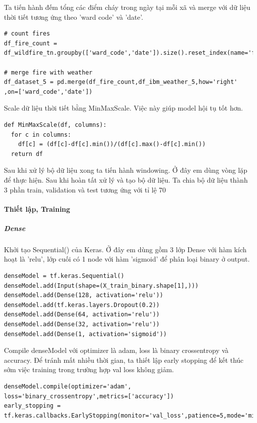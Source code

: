 \documentclass{article}
\begin{document}
Ta tiến hành đếm tổng các điểm cháy trong ngày tại mỗi xã và merge với dữ liệu thời tiết tương ứng theo 'ward code' và 'date'.

\begin{verbatim}
# count fires
df_fire_count = df_wildfire_tn.groupby(['ward_code','date']).size().reset_index(name='fires')

# merge fire with weather
df_dataset_5 = pd.merge(df_fire_count,df_ibm_weather_5,how='right' ,on=['ward_code','date'])
\end{verbatim}

Scale dữ liệu thời tiết bằng MinMaxScale. Việc này giúp model hội tụ tốt hơn.

\begin{verbatim}
def MinMaxScale(df, columns):
  for c in columns:
    df[c] = (df[c]-df[c].min())/(df[c].max()-df[c].min())
  return df
\end{verbatim}

Sau khi xử lý bộ dữ liệu xong ta tiến hành windowing. Ở đây em dùng vòng lặp để thực hiện. Sau khi hoàn tất xử lý và tạo bộ dữ liệu. Ta chia bộ dữ liệu thành 3 phần train, validation và test tương ứng với tỉ lệ 70%

\paragraph{Thiết lập, Training}
\subparagraph{Dense} Khởi tạo Sequential() của Keras. Ở đây em dùng gồm 3 lớp Dense với hàm kích hoạt là 'relu', lớp cuối có 1 node với hàm 'sigmoid' để phân loại binary ở output. 

\begin{verbatim}
denseModel = tf.keras.Sequential()
denseModel.add(Input(shape=(X_train_binary.shape[1],)))
denseModel.add(Dense(128, activation='relu'))
denseModel.add(tf.keras.layers.Dropout(0.2))
denseModel.add(Dense(64, activation='relu'))
denseModel.add(Dense(32, activation='relu'))
denseModel.add(Dense(1, activation='sigmoid'))
\end{verbatim}

Compile denseModel với optimizer là adam, loss là binary crossentropy và accuracy. Để tránh mất nhiều thời gian, ta thiết lập early stopping để kết thúc sớm việc training trong trường hợp val loss không giảm.

\begin{verbatim}
denseModel.compile(optimizer='adam', loss='binary_crossentropy',metrics=['accuracy'])
early_stopping = tf.keras.callbacks.EarlyStopping(monitor='val_loss',patience=5,mode='min')
\end{verbatim}
\end{document}
